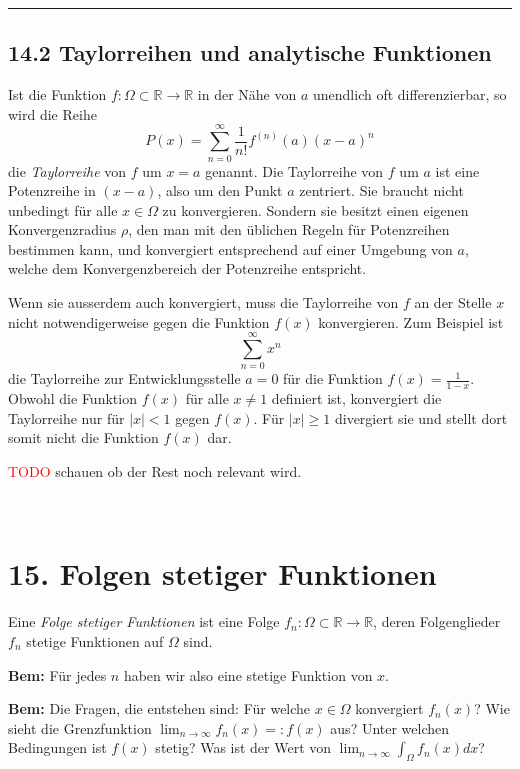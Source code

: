 \documentclass[a4paper,landscape,8pt]{extarticle}
\newcommand{\R}{\mathbb{R}}
\newcommand{\abs}[1]{\left\lvert #1 \right\rvert}
\newcommand{\todo}{\textcolor{red}{TODO }}
\newcommand{\sep}{\vspace{5pt}\noindent\hrule\vspace{5pt}}
\newcommand{\Bem}{\textbf{Bem: }}
\renewcommand*{\newpage}{ \ }
\begin{document}
\begin{multicols*}{4}
\begin{warmup}
\sep
\end{warmup}

\begin{warmup}
\subsection{14.2 Taylorreihen und analytische Funktionen}

Ist die Funktion $f\colon\Omega\subset\R\to\R$ in der Nähe von $a$ unendlich oft
differenzierbar, so wird die Reihe
\[
P(x) = \sum_{n=0}^{\infty} \frac{1}{n!}f^{(n)}(a)(x-a)^n
\]
die \emph{Taylorreihe} von $f$ um $x=a$ genannt. Die Taylorreihe von $f$ um $a$
ist eine Potenzreihe in $(x-a)$, also um den Punkt $a$ zentriert. Sie braucht nicht
unbedingt für alle $x\in\Omega$ zu konvergieren. Sondern sie besitzt einen
eigenen Konvergenzradius $\rho$, den man mit den üblichen Regeln für
Potenzreihen bestimmen kann, und konvergiert entsprechend auf einer Umgebung von
$a$, welche dem Konvergenzbereich der Potenzreihe entspricht.

Wenn sie ausserdem auch konvergiert, muss die Taylorreihe von $f$ an der Stelle
$x$ nicht notwendigerweise gegen die Funktion $f(x)$ konvergieren. Zum Beispiel
ist
\[
\sum_{n=0}^\infty x^n
\]
die Taylorreihe zur Entwicklungsstelle $a=0$ für die Funktion
$f(x)=\frac{1}{1-x}$. Obwohl die Funktion $f(x)$ für alle $x\neq 1$ definiert
ist, konvergiert die Taylorreihe nur für $\abs{x}<1$ gegen $f(x)$. Für
$\abs{x}\geq 1$ divergiert sie und stellt dort somit nicht die Funktion $f(x)$
dar.

\todo schauen ob der Rest noch relevant wird.

\end{warmup}

\newpage

\section{15. Folgen stetiger Funktionen}

\Def Eine \emph{Folge stetiger Funktionen} ist eine Folge
$f_n\colon\Omega\subset\R\to\R$, deren Folgenglieder $f_n$ stetige Funktionen
auf $\Omega$ sind.

\Bem Für jedes $n$ haben wir also eine stetige Funktion von $x$.

\Bem Die Fragen, die entstehen sind: Für welche $x\in\Omega$ konvergiert
$f_n(x)$? Wie sieht die Grenzfunktion $\lim_{n\to\infty} f_n(x)=:f(x)$ aus?
Unter welchen Bedingungen ist $f(x)$ stetig? Was ist der Wert von
$\lim_{n\to\infty}\int_\Omega f_n(x) dx$?


\end{multicols*}
\end{document}
